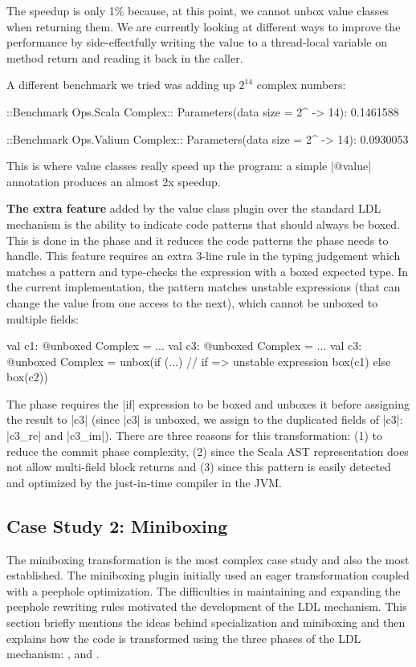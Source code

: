 The speedup is only 1\% because, at this point, we cannot unbox value classes when returning them. We are currently looking at different ways to improve the performance by side-effectfully writing the value to a thread-local variable on method return and reading it back in the caller.

A different benchmark we tried was adding up $2^{14}$ complex numbers:

\begin{lstlisting-nobreak}
 ::Benchmark Ops.Scala Complex::
 Parameters(data size = 2^ -> 14): 0.1461588

 ::Benchmark Ops.Valium Complex::
 Parameters(data size = 2^ -> 14): 0.0930053
\end{lstlisting-nobreak}

This is where value classes really speed up the program: a simple |@value| annotation produces an almost 2x speedup.

\textbf{The extra feature} added by the value class plugin over the standard LDL mechanism is the ability to indicate code patterns that should always be boxed. This is done in the \coerce{} phase and it reduces the code patterns the \commit{} phase needs to handle. This feature requires an extra 3-line rule in the typing judgement which matches a pattern and type-checks the expression with a boxed expected type. In the current implementation, the pattern matches unstable expressions (that can change the value from one access to the next), which cannot be unboxed to multiple fields:

\begin{lstlisting-nobreak}
 val c1: @unboxed Complex = ...
 val c3: @unboxed Complex = ...
 val c3: @unboxed Complex =
   unbox(if (...) // if => unstable expression
             box(c1)
           else
             box(c2))
\end{lstlisting-nobreak}

The \coerce{} phase requires the |if| expression to be boxed and unboxes it before assigning the result to |c3| (since |c3| is unboxed, we assign to the duplicated fields of |c3|: |c3_re| and |c3_im|). There are three reasons for this transformation: (1) to reduce the commit phase complexity, (2) since the Scala AST representation does not allow multi-field block returns and (3) since this pattern is easily detected and optimized by the just-in-time compiler in the JVM.


\subsection{Case Study 2: Miniboxing}
\label{ldl:sec:validation/miniboxing}
The miniboxing transformation \cite{miniboxing, miniboxing-www} is the most complex case study and also the most established. The miniboxing plugin initially used an eager transformation coupled with a peephole optimization. The difficulties in maintaining and expanding the peephole rewriting rules motivated the development of the LDL mechanism. This section briefly mentions the ideas behind specialization and miniboxing and then explains how the code is transformed using the three phases of the LDL mechanism: \inject{}, \coerce{} and \commit{}.


